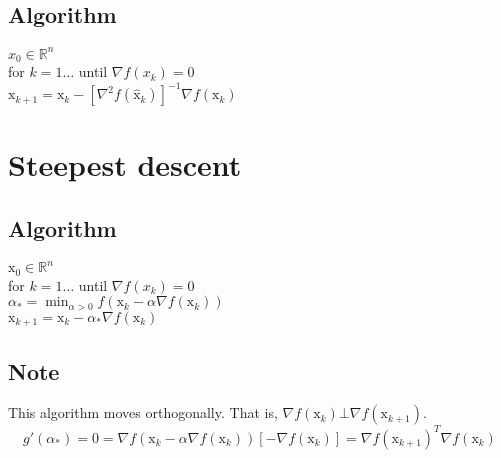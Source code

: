 \documentclass[6pt]{article}
\def\x{\textrm{x}}
\def\xh{\hat{\textrm{x}}}
\begin{document}
\subsection{Algorithm}
$x_0 \in \mathbb{R}^n$\\
for $k=1\ldots $ until $\nabla f(x_k) = 0$\\
\indent $\x_{k+1} = \x_{k} -[\nabla^2 f(\xh_k)]^{-1} \nabla f(\x_k)$

\section{Steepest descent}
\subsection{Algorithm}
$\x_0 \in \mathbb{R}^n$\\
for $k=1\ldots$ until $\nabla f(x_k) = 0$\\
\indent $\alpha_* = \min_{\alpha>0} f(\x_{k} - \alpha \nabla f(\x_{k}))$\\
\indent $\x_{k+1} = \x_{k} - \alpha_* \nabla f(\x_{k})$

\subsection{Note}
This algorithm moves orthogonally. That is, $\nabla f(\x_k) \bot \nabla f(\x_{k+1})$.
$$g'(\alpha_*) = 0 = \nabla f(\x_k - \alpha \nabla f(\x_k))[-\nabla f(\x_k)] = \nabla f(\x_{k+1})^T\nabla f(\x_k)$$
\end{document}
